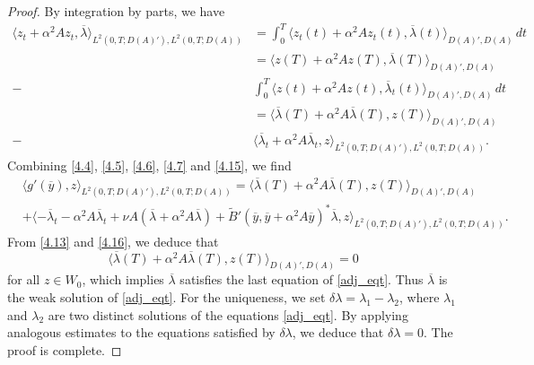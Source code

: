\documentclass[reqno]{amsart}
\begin{document}
\begin{proof}
		By integration by parts, we have
		\begin{align}\label{4.15}
			{\langle z_t + \alpha^2 Az_t,\overline{\lambda} \rangle_{L^2(0,T;D(A)'),L^2(0,T;D(A))}} &= \int_0^T \langle z_t(t) + \alpha^2 Az_t(t),\overline{\lambda}(t) \rangle_{D(A)',D(A)} \,dt \nonumber \\ 
			&= \langle z(T) + \alpha^2 Az(T),\overline{\lambda}(T) \rangle_{D(A)',D(A)} \nonumber \\ - &\int_0^T  \langle z(t) + \alpha^2 Az(t),\overline{\lambda}_t(t) \rangle_{D(A)',D(A)}\,dt \nonumber\\
			&= \langle \overline{\lambda}(T) + \alpha^2 A\overline{\lambda}(T),z(T) \rangle_{D(A)',D(A)} \nonumber\\ - &\langle \overline{\lambda}_t + \alpha^2 A\overline{\lambda}_t,z \rangle_{L^2(0,T;D(A)'),L^2(0,T;D(A))}.
		\end{align}
		Combining \eqref{4.4}, \eqref{4.5}, \eqref{4.6}, \eqref{4.7} and \eqref{4.15}, we find 
		\begin{equation}\label{4.16}
			\begin{aligned}
				&\langle g'(\overline{y}), z\rangle_{L^2(0,T;D(A)'),L^2(0,T;D(A))}  = \langle \overline{\lambda}(T) + \alpha^2 A\overline{\lambda}(T),z(T) \rangle_{D(A)',D(A)} \\
				&+ \langle -\overline{\lambda}_t - \alpha^2 A \overline{\lambda}_t + \nu A (\overline{\lambda}+\alpha^2 A\overline{\lambda}) 
				+ \widetilde{B}'(\overline{y},\overline{y} +\alpha^2 A\overline{y})^*\overline{\lambda},z\rangle_{L^2(0,T;D(A)'),L^2(0,T;D(A))}.  
			\end{aligned}
		\end{equation}
		From \eqref{4.13} and \eqref{4.16}, we deduce that 
		$$\langle \overline{\lambda}(T) + \alpha^2 A\overline{\lambda}(T),z(T) \rangle_{D(A)',D(A)} = 0$$ for all $z \in W_0$, which implies $\overline{\lambda}$ satisfies the last equation of \eqref{adj_eqt}. Thus $\overline{\lambda}$ is the weak solution of \eqref{adj_eqt}. 
		For the uniqueness, we set $\delta \lambda=\lambda_1-\lambda_2$, where $\lambda_1$ and $\lambda_2$ are two distinct solutions of the equations \eqref{adj_eqt}. By applying analogous estimates to the equations satisfied by $\delta \lambda$, we deduce that $\delta \lambda=0$. The proof is complete.
	\end{proof}
	
\end{document}
